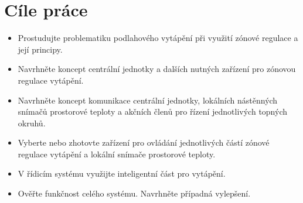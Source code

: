 \section{Cíle práce}
\begin{itemize}
\item Prostudujte problematiku podlahového vytápění při využití zónové regulace a její principy.
\item Navrhněte koncept centrální jednotky a dalších nutných zařízení pro zónovou regulace vytápění.
\item Navrhněte koncept komunikace centrální jednotky, lokálních nástěnných snímačů prostorové teploty a akčních členů pro řízení jednotlivých topných okruhů.
\item Vyberte nebo zhotovte zařízení pro ovládání jednotlivých částí zónové regulace vytápění a lokální snímače prostorové teploty.
\item V řídicím systému využijte inteligentní část pro vytápění.
\item Ověřte funkčnost celého systému. Navrhněte případná vylepšení.

\end{itemize}
